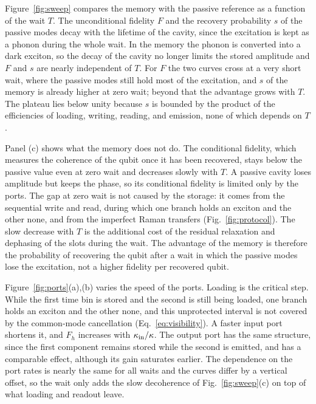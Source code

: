 \documentclass[aps,pra,preprint,groupedaddress,amsmath,amssymb,floatfix]{revtex4-2}
\begin{document}
Figure~\ref{fig:sweep} compares the memory with the passive reference as a function of the wait $T$. The unconditional fidelity $F$ and the recovery probability $s$ of the passive modes decay with the lifetime of the cavity, since the excitation is kept as a phonon during the whole wait. In the memory the phonon is converted into a dark exciton, so the decay of the cavity no longer limits the stored amplitude and $F$ and $s$ are nearly independent of $T$. For $F$ the two curves cross at a very short wait, where the passive modes still hold most of the excitation, and $s$ of the memory is already higher at zero wait; beyond that the advantage grows with $T$. The plateau lies below unity because $s$ is bounded by the product of the efficiencies of loading, writing, reading, and emission, none of which depends on $T$.

Panel (c) shows what the memory does not do. The conditional fidelity, which measures the coherence of the qubit once it has been recovered, stays below the passive value even at zero wait and decreases slowly with $T$. A passive cavity loses amplitude but keeps the phase, so its conditional fidelity is limited only by the ports. The gap at zero wait is not caused by the storage: it comes from the sequential write and read, during which one branch holds an exciton and the other none, and from the imperfect Raman transfers (Fig.~\ref{fig:protocol}). The slow decrease with $T$ is the additional cost of the residual relaxation and dephasing of the slots during the wait. The advantage of the memory is therefore the probability of recovering the qubit after a wait in which the passive modes lose the excitation, not a higher fidelity per recovered qubit.

Figure~\ref{fig:ports}(a),(b) varies the speed of the ports. Loading is the critical step. While the first time bin is stored and the second is still being loaded, one branch holds an exciton and the other none, and this unprotected interval is not covered by the common-mode cancellation (Eq.~\eqref{eq:visibility}). A faster input port shortens it, and $F_h$ increases with $\kappa_{\rm in}/\kappa$. The output port has the same structure, since the first component remains stored while the second is emitted, and has a comparable effect, although its gain saturates earlier. The dependence on the port rates is nearly the same for all waits and the curves differ by a vertical offset, so the wait only adds the slow decoherence of Fig.~\ref{fig:sweep}(c) on top of what loading and readout leave.
\end{document}

